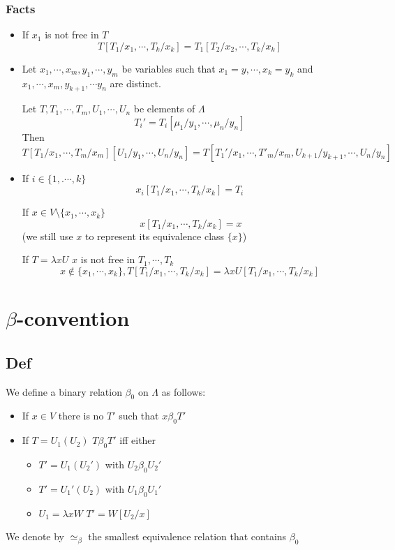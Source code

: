 \documentclass{book}
\begin{document}
\subsection{Facts}
\begin{itemize}
    \item If $x_1$ is not free in $T$$$T[T_1/x_1,\cdots,T_k/x_k]=T_1[T_2/x_2,\cdots,T_k/x_k]$$
    \item Let $x_1,\cdots,x_m,y_1,\cdots,y_m$ be variables such that $x_1=y,\cdots,x_k=y_k$ and $x_1,\cdots,x_m,y_{k+1},\cdots y_n$ are distinct.
    
    Let $T,T_1,\cdots,T_m,U_1,\cdots,U_n$ be elements of $\Lambda$ $$T_i'=T_i[\mu_1/y_1,\cdots,\mu_n/y_n]$$
    Then $$T[T_1/x_1,\cdots,T_m/x_m][U_1/y_1,\cdots,U_n/y_n]=T[T_1'/x_1,\cdots,T'_m/x_m,U_{k+1}/y_{k+1},\cdots,U_n/y_n]$$ 
    \item If $i\in \{1,.\cdots,k\}$$$x_i[T_1/x_1,\cdots,T_k/x_k]=T_i$$
    
    If $x\in V\setminus\{x_1,\cdots,x_k\}$$$\ x[T_1/x_1,\cdots,T_k/x_k]=x$$(we still use $x$ to represent its equivalence class $\{x\}$) 

    If $T=\lambda xU$ $x$ is not free in $T_1,\cdots,T_k$
    $$x\not\in \{x_1,\cdots,x_k\},T[T_1/x_1,\cdots,T_k/x_k]=\lambda xU[T_1/x_1,\cdots,T_k/x_k]$$
\end{itemize}
\chapter{$\beta$-convention}
\section{Def}
We define a binary relation $\beta_0$ on $\Lambda$ as follows:
\begin{itemize}
    \item If $x\in V$ there is no $T'$ such that $x\beta _0 T'$
    \item If $T=U_1(U_2)$ $T\beta _0T'$ iff either\begin{itemize}
        \item $T'=U_1(U_2')$ with $U_2\beta _0 U_2'$
        \item $T'=U_1'(U_2)$ with $U_1\beta _0 U_1'$
        \item $U_1=\lambda xW$ $T'=W[U_2/x]$
    \end{itemize} 
\end{itemize}
We denote by $\simeq_\beta$ the smallest equivalence relation that contains $\beta_0$
\end{document}
